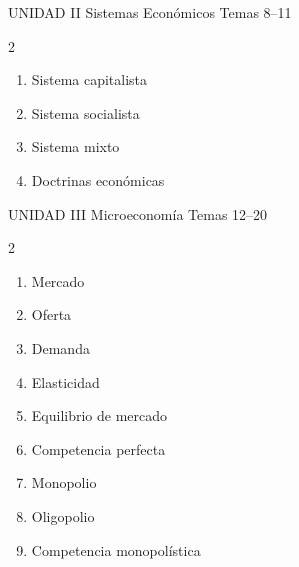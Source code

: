 \begin{tcolorbox}[enhanced, colback=AzulMedio, colframe=DoradoAcadémico,
    arc=3pt, boxrule=1pt, left=8pt, right=8pt, top=5pt, bottom=5pt,
    fontupper=\sffamily\bfseries\color{white}]
  UNIDAD II \hfill Sistemas Económicos \hfill Temas 8–11
\end{tcolorbox}
\begin{multicols}{2}
  \begin{enumerate}[label=\textcolor{AzulMedio}{\textbf{\arabic*.}},
      leftmargin=2em, itemsep=1pt, start=8]
    \item Sistema capitalista
    \item Sistema socialista
    \item Sistema mixto
    \item Doctrinas económicas
  \end{enumerate}
\end{multicols}

\vspace{0.3cm}

\begin{tcolorbox}[enhanced, colback=AzulPizarra, colframe=DoradoAcadémico,
    arc=3pt, boxrule=1pt, left=8pt, right=8pt, top=5pt, bottom=5pt,
    fontupper=\sffamily\bfseries\color{white}]
  UNIDAD III \hfill Microeconomía \hfill Temas 12–20
\end{tcolorbox}
\begin{multicols}{2}
  \begin{enumerate}[label=\textcolor{AzulPizarra}{\textbf{\arabic*.}},
      leftmargin=2em, itemsep=1pt, start=12]
    \item Mercado
    \item Oferta
    \item Demanda
    \item Elasticidad
    \item Equilibrio de mercado
    \item Competencia perfecta
    \item Monopolio
    \item Oligopolio
    \item Competencia monopolística
  \end{enumerate}
\end{multicols}

\vspace{0.3cm}

